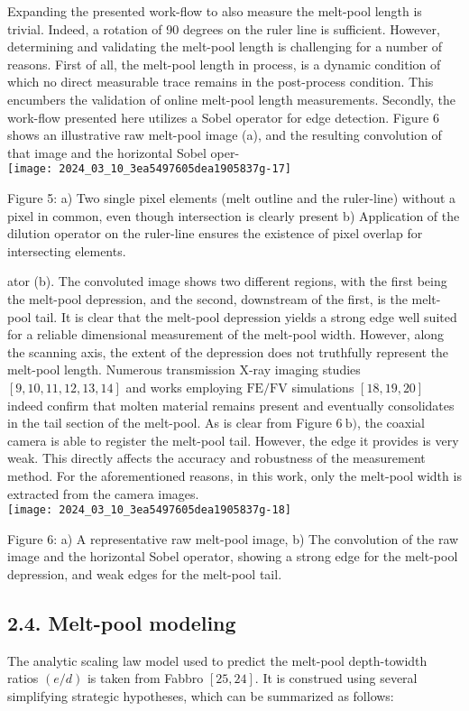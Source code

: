 \documentclass[10pt]{article}
\begin{document}
Expanding the presented work-flow to also measure the melt-pool length is trivial. Indeed, a rotation of 90 degrees on the ruler line is sufficient. However, determining and validating the melt-pool length is challenging for a number of reasons. First of all, the melt-pool length in process, is a dynamic condition of which no direct measurable trace remains in the post-process condition. This encumbers the validation of online melt-pool length measurements. Secondly, the work-flow presented here utilizes a Sobel operator for edge detection. Figure 6 shows an illustrative raw melt-pool image (a), and the resulting convolution of that image and the horizontal Sobel oper-\\
\texttt{[image: 2024\_03\_10\_3ea5497605dea1905837g-17]}

Figure 5: a) Two single pixel elements (melt outline and the ruler-line) without a pixel in common, even though intersection is clearly present b) Application of the dilution operator on the ruler-line ensures the existence of pixel overlap for intersecting elements.

ator (b). The convoluted image shows two different regions, with the first being the melt-pool depression, and the second, downstream of the first, is the melt-pool tail. It is clear that the melt-pool depression yields a strong edge well suited for a reliable dimensional measurement of the melt-pool width. However, along the scanning axis, the extent of the depression does not truthfully represent the melt-pool length. Numerous transmission X-ray imaging studies $[9,10,11,12,13,14]$ and works employing $\mathrm{FE} / \mathrm{FV}$ simulations $[18,19,20]$ indeed confirm that molten material remains present and eventually consolidates in the tail section of the melt-pool. As is clear from Figure $6 \mathrm{~b})$, the coaxial camera is able to register the melt-pool tail. However, the edge it provides is very weak. This directly affects the accuracy and robustness of the measurement method. For the aforementioned reasons, in this work, only the melt-pool width is extracted from the camera images.\\
\texttt{[image: 2024\_03\_10\_3ea5497605dea1905837g-18]}

Figure 6: a) A representative raw melt-pool image, b) The convolution of the raw image and the horizontal Sobel operator, showing a strong edge for the melt-pool depression, and weak edges for the melt-pool tail.

\subsection*{2.4. Melt-pool modeling}
The analytic scaling law model used to predict the melt-pool depth-towidth ratios $(e / d)$ is taken from Fabbro $[25,24]$. It is construed using several simplifying strategic hypotheses, which can be summarized as follows:
\end{document}
